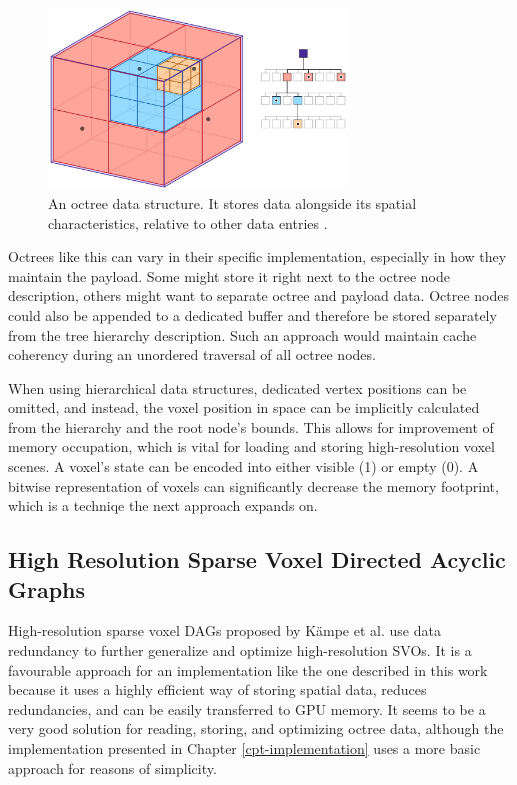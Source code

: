 \begin{figure}[h]
    \centering
    \includegraphics[width=300px]{images/graphics/octree.jpg}
    \caption{An octree data structure. It stores data alongside its spatial characteristics, relative to 
    other data entries \cite{Six2021}.}
    \label{fig:octree}
\end{figure}

\noindent
Octrees like this can vary in their specific implementation, especially in how they maintain the 
payload. Some might store it right next to the octree node description, others might want to separate 
octree and payload data. Octree nodes could also be appended to a dedicated buffer and therefore 
be stored separately from the tree hierarchy description. Such an approach would maintain cache 
coherency during an unordered traversal of all octree nodes.\\
\enlargethispage{\baselineskip}
\enlargethispage{\baselineskip}

\noindent
When using hierarchical data structures, dedicated vertex positions can be omitted, and instead, 
the voxel position in space can be implicitly calculated from the hierarchy and the root node's bounds. 
This allows for improvement of memory occupation, which is vital for loading and storing high-resolution 
voxel scenes. A voxel's state can be encoded into either visible (1) or empty (0). A bitwise representation 
of voxels can significantly decrease the memory footprint, which is a techniqe the next approach expands on.

\subsection*{High Resolution Sparse Voxel Directed Acyclic Graphs} \label{subsec-highres-svo-dags}

High-resolution sparse voxel \ac{DAG}s proposed by Kämpe et al. \cite{Kampe2013} use data redundancy to further 
generalize and optimize high-resolution \ac{SVO}s. It is a favourable approach for an implementation like 
the one described in this work because it uses a highly efficient way of storing spatial data, reduces redundancies, 
and can be easily transferred to \ac{GPU} memory. It seems to be a very good solution for reading, storing, and 
optimizing octree data, although the implementation presented in Chapter \ref{cpt-implementation} uses a more basic 
approach for reasons of simplicity. 


